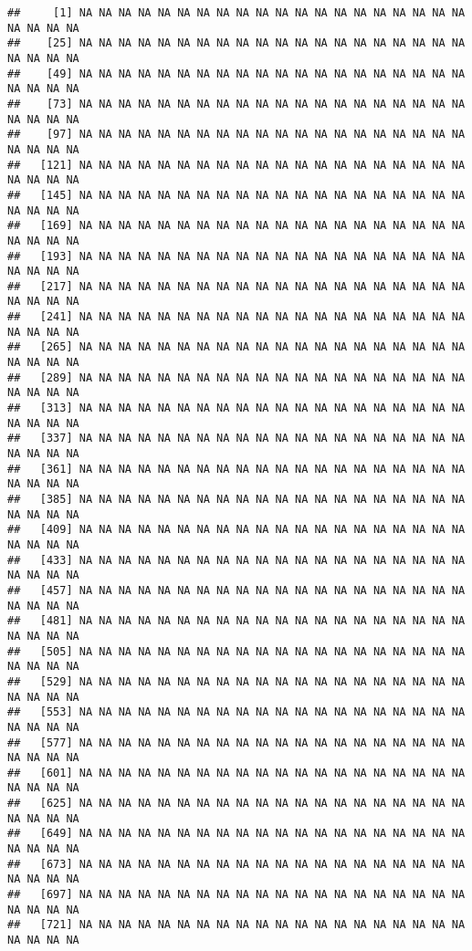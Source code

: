 \documentclass[
]{article}
\begin{document}
\begin{verbatim}
##     [1] NA NA NA NA NA NA NA NA NA NA NA NA NA NA NA NA NA NA NA NA NA NA NA NA
##    [25] NA NA NA NA NA NA NA NA NA NA NA NA NA NA NA NA NA NA NA NA NA NA NA NA
##    [49] NA NA NA NA NA NA NA NA NA NA NA NA NA NA NA NA NA NA NA NA NA NA NA NA
##    [73] NA NA NA NA NA NA NA NA NA NA NA NA NA NA NA NA NA NA NA NA NA NA NA NA
##    [97] NA NA NA NA NA NA NA NA NA NA NA NA NA NA NA NA NA NA NA NA NA NA NA NA
##   [121] NA NA NA NA NA NA NA NA NA NA NA NA NA NA NA NA NA NA NA NA NA NA NA NA
##   [145] NA NA NA NA NA NA NA NA NA NA NA NA NA NA NA NA NA NA NA NA NA NA NA NA
##   [169] NA NA NA NA NA NA NA NA NA NA NA NA NA NA NA NA NA NA NA NA NA NA NA NA
##   [193] NA NA NA NA NA NA NA NA NA NA NA NA NA NA NA NA NA NA NA NA NA NA NA NA
##   [217] NA NA NA NA NA NA NA NA NA NA NA NA NA NA NA NA NA NA NA NA NA NA NA NA
##   [241] NA NA NA NA NA NA NA NA NA NA NA NA NA NA NA NA NA NA NA NA NA NA NA NA
##   [265] NA NA NA NA NA NA NA NA NA NA NA NA NA NA NA NA NA NA NA NA NA NA NA NA
##   [289] NA NA NA NA NA NA NA NA NA NA NA NA NA NA NA NA NA NA NA NA NA NA NA NA
##   [313] NA NA NA NA NA NA NA NA NA NA NA NA NA NA NA NA NA NA NA NA NA NA NA NA
##   [337] NA NA NA NA NA NA NA NA NA NA NA NA NA NA NA NA NA NA NA NA NA NA NA NA
##   [361] NA NA NA NA NA NA NA NA NA NA NA NA NA NA NA NA NA NA NA NA NA NA NA NA
##   [385] NA NA NA NA NA NA NA NA NA NA NA NA NA NA NA NA NA NA NA NA NA NA NA NA
##   [409] NA NA NA NA NA NA NA NA NA NA NA NA NA NA NA NA NA NA NA NA NA NA NA NA
##   [433] NA NA NA NA NA NA NA NA NA NA NA NA NA NA NA NA NA NA NA NA NA NA NA NA
##   [457] NA NA NA NA NA NA NA NA NA NA NA NA NA NA NA NA NA NA NA NA NA NA NA NA
##   [481] NA NA NA NA NA NA NA NA NA NA NA NA NA NA NA NA NA NA NA NA NA NA NA NA
##   [505] NA NA NA NA NA NA NA NA NA NA NA NA NA NA NA NA NA NA NA NA NA NA NA NA
##   [529] NA NA NA NA NA NA NA NA NA NA NA NA NA NA NA NA NA NA NA NA NA NA NA NA
##   [553] NA NA NA NA NA NA NA NA NA NA NA NA NA NA NA NA NA NA NA NA NA NA NA NA
##   [577] NA NA NA NA NA NA NA NA NA NA NA NA NA NA NA NA NA NA NA NA NA NA NA NA
##   [601] NA NA NA NA NA NA NA NA NA NA NA NA NA NA NA NA NA NA NA NA NA NA NA NA
##   [625] NA NA NA NA NA NA NA NA NA NA NA NA NA NA NA NA NA NA NA NA NA NA NA NA
##   [649] NA NA NA NA NA NA NA NA NA NA NA NA NA NA NA NA NA NA NA NA NA NA NA NA
##   [673] NA NA NA NA NA NA NA NA NA NA NA NA NA NA NA NA NA NA NA NA NA NA NA NA
##   [697] NA NA NA NA NA NA NA NA NA NA NA NA NA NA NA NA NA NA NA NA NA NA NA NA
##   [721] NA NA NA NA NA NA NA NA NA NA NA NA NA NA NA NA NA NA NA NA NA NA NA NA

\end{verbatim}
\end{document}
